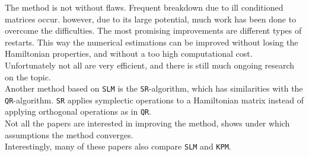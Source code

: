 \noindent The method is not without flaws. Frequent breakdown due to ill conditioned matrices occur. however, due to its large potential, much work has been done to overcome the difficulties. The most promising improvements are different types of restarts. This way the numerical estimations can be improved without losing the Hamiltonian properties, and without a too high computational cost.
Unfortunately not all are very efficient, and there is still much ongoing research on the topic. \\

\noindent Another method based on \texttt{SLM} is the \texttt{SR}-algorithm, which has similarities with the \texttt{QR}-algorithm. \texttt{SR} applies symplectic operations to a Hamiltonian matrix instead of applying orthogonal operations as in \texttt{QR}. \\

\noindent Not all the papers are interested in improving the method, \cite{SLM4} shows under which assumptions the method converges. \\

\noindent Interestingly, many of these papers also compare \texttt{SLM} and \texttt{KPM}.


 
